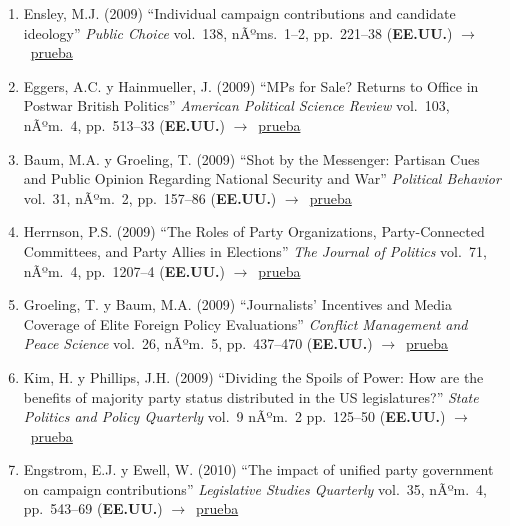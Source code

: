 \documentclass[12 pt, letter]{article}
\newenvironment{CitasMiTrabajo}{
    \begin{footnotesize}
    \begin{enumerate}[label={\footnotesize\emph{cita~\arabic*}},ref=\arabic*] %
        \setlength{\itemsep}{.1\itemsep}
        \setlength{\parskip}{.1\parskip}
    }{\end{enumerate}\end{footnotesize}}
\begin{document}
\begin{CitasMiTrabajo}
        \item Ensley, M.J. (2009)
        ``Individual campaign contributions and
        candidate ideology'' \emph{Public Choice} vol.\ 138, nÃºms.\
        1--2, pp.\ 221--38  (\textbf{EE.UU.}) $\rightarrow$~\href{http://ericmagar.com/cv/cites/coxMagar/ensley.pdf}{prueba}

        \item Eggers, A.C. y Hainmueller, J. (2009)
        ``MPs for Sale? Returns to Office in Postwar British Politics''
        \emph{American Political Science Review} vol.\ 103, nÃºm.\ 4, pp.\ 513--33  (\textbf{EE.UU.}) $\rightarrow$~\href{http://ericmagar.com/cv/cites/coxMagar/eggers.pdf}{prueba}

        \item Baum, M.A. y Groeling, T. (2009)
        ``Shot by the Messenger: Partisan Cues and Public Opinion
        Regarding National Security and War''
        \emph{Political Behavior}  vol.\ 31, nÃºm.\ 2, pp.\ 157--86 (\textbf{EE.UU.}) $\rightarrow$~\href{http://ericmagar.com/cv/cites/coxMagar/baum.pdf}{prueba}

        \item Herrnson, P.S. (2009) ``The Roles of Party Organizations, Party-Connected Committees, and Party Allies in Elections'' \emph{The Journal of Politics} vol.\ 71, nÃºm.\ 4, pp.\ 1207--4 (\textbf{EE.UU.}) $\rightarrow$~\href{http://ericmagar.com/cv/cites/coxMagar/herrnsonPartyOrginEls2009jop.pdf}{prueba}

        \item Groeling, T. y Baum, M.A. (2009) ``Journalists' Incentives and Media Coverage of Elite Foreign Policy Evaluations''
            \emph{Conflict Management and Peace Science} vol.\ 26, nÃºm.\ 5, pp.\ 437--470 (\textbf{EE.UU.}) $\rightarrow$~\href{http://ericmagar.com/cv/cites/coxMagar/groeling+baumJournalists2009.pdf}{prueba}

       \item Kim, H. y Phillips, J.H. (2009) ``Dividing the Spoils of Power: How are the benefits of majority party status distributed in the US legislatures?'' \emph{State Politics and Policy Quarterly} vol.\ 9 nÃºm.\ 2 pp.\ 125--50 (\textbf{EE.UU.}) $\rightarrow$~\href{http://ericmagar.com/cv/cites/coxMagar/kim+philips.pdf}{prueba}

        \item Engstrom, E.J. y Ewell, W. (2010)
        ``The impact of unified party government on campaign contributions'' \emph{Legislative Studies Quarterly} vol.\ 35, nÃºm.\ 4, pp.\ 543--69 (\textbf{EE.UU.}) $\rightarrow$~\href{http://ericmagar.com/cv/cites/coxMagar/eng.pdf}{prueba}


\end{CitasMiTrabajo}
\end{document}
